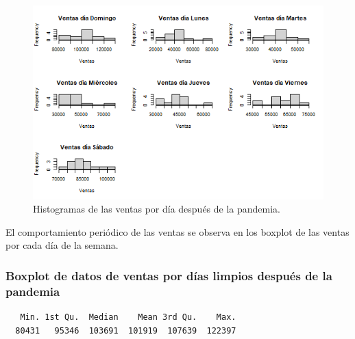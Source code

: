 \documentclass[
  us-letterpaper,
]{scrreprt}
\newenvironment{Shaded}{\begin{snugshade}}{\end{snugshade}}
\newcommand{\FunctionTok}[1]{\textcolor[rgb]{0.28,0.35,0.67}{#1}}
\newcommand{\NormalTok}[1]{\textcolor[rgb]{0.00,0.23,0.31}{#1}}
\newcommand{\SpecialCharTok}[1]{\textcolor[rgb]{0.37,0.37,0.37}{#1}}
\theoremstyle{plain}
\theoremstyle{plain}
\theoremstyle{definition}
\theoremstyle{remark}
\begin{document}
\begin{figure}[H]

{\centering \includegraphics[width=0.8\linewidth,height=\textheight,keepaspectratio]{his_2.png}

}

\caption{Histogramas de las ventas por día después de la pandemia.}

\end{figure}%

El comportamiento periódico de las ventas se observa en los boxplot de
las ventas por cada día de la semana.

\subsubsection{Boxplot de datos de ventas por días limpios después de la
pandemia}\label{boxplot-de-datos-de-ventas-por-duxedas-limpios-despuuxe9s-de-la-pandemia}

\begin{Shaded}
\end{Shaded}

\begin{verbatim}
   Min. 1st Qu.  Median    Mean 3rd Qu.    Max. 
  80431   95346  103691  101919  107639  122397 
\end{verbatim}

\begin{Shaded}
\end{Shaded}
\end{document}
